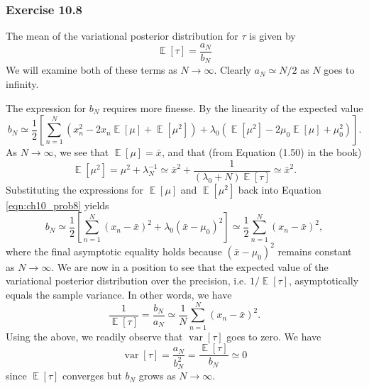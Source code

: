 \documentclass[12pt, a4paper]{article}
\DeclareMathOperator{\E}{\mathbb{E}}
\DeclareMathOperator{\var}{\operatorname{var}}
\begin{document}
\subsubsection*{Exercise 10.8}
The mean of the variational posterior distribution for $\tau$ is given by
\begin{equation*}
	\E[\tau] = \frac{a_N}{b_N}
\end{equation*}
We will examine both of these terms as $N \to \infty$.
Clearly $a_N \simeq N / 2$ as $N$ goes to infinity.

The expression for $b_N$ requires more finesse.
By the linearity of the expected value
\begin{equation}
\label{eqn:ch10_prob8}
b_N \simeq 
	\frac{1}{2}
	\left[
	\sum_{n=1}^{N} \left( x_n^2 - 2 x_n \E [\mu] + \E [\mu^2 ] \right)
	+
	\lambda_0 \left( 
	\E [\mu^2 ] - 2 \mu_0 \E [\mu] + \mu_0^2
	 \right)
	\right].
\end{equation}
As $N \to \infty$, we see that $\E [\mu] = \bar{x}$, and that (from Equation (1.50) in the book)
\begin{equation*}
	\E [\mu^2] = \mu^2 + \lambda_N^{-1}
	\simeq \bar{x}^2 +
	\frac{1}{(\lambda_0 +N) \E [\tau]}
	\simeq
	\bar{x}^2.
\end{equation*}
Substituting the expressions for $\E [\mu]$ and $\E [\mu^2]$ back into Equation \eqref{eqn:ch10_prob8} yields
\begin{equation*}
b_N \simeq 
\frac{1}{2}
\left[
\sum_{n=1}^{N} \left( x_n - \bar{x} \right)^2
+
\lambda_0 \left( 
\bar{x} - \mu_0
\right)^2
\right]
\simeq 
\frac{1}{2}
\sum_{n=1}^{N} \left( x_n - \bar{x} \right)^2,
\end{equation*}
where the final asymptotic equality holds because $(\bar{x} - \mu_0)^2$ remains constant as $N \to \infty$.
We are now in a position to see that the expected value of the variational posterior distribution over the precision, i.e. $1 / \E[\tau]$, asymptotically equals the sample variance.
In other words, we have
\begin{equation*}
	\frac{1}{\E[\tau]} = \frac{b_N}{a_N} \simeq \frac{1}{N} 
	\sum_{n=1}^{N} \left( x_n - \bar{x} \right)^2.
\end{equation*}
Using the above, we readily observe that $\var[\tau]$ goes to zero.
We have 
\begin{equation*}
\var[\tau] = \frac{a_N}{b_N^2} =  \frac{\E[\tau]}{b_N} \simeq 0
\end{equation*}
since $\E[\tau]$ converges but $b_N$ grows as $N \to \infty$.
\end{document}
